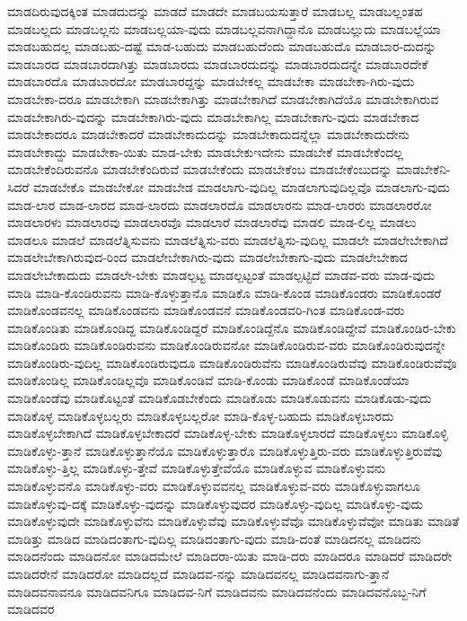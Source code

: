 {ಮಾಡದಿರುವುದಕ್ಕಿಂತ
ಮಾಡದುದನ್ನು
ಮಾಡದೆ
ಮಾಡದೇ
ಮಾಡಬಯಸುತ್ತಾರೆ
ಮಾಡಬಲ್ಲ
ಮಾಡಬಲ್ಲಂತಹ
ಮಾಡಬಲ್ಲದು
ಮಾಡಬಲ್ಲನು
ಮಾಡಬಲ್ಲಯಾ-ವುದು
ಮಾಡಬಲ್ಲವನಾಗಿದ್ದಾನೊ
ಮಾಡಬಲ್ಲುದು
ಮಾಡಬಲ್ಲೆಯಾ
ಮಾಡಬಹುದಲ್ಲ
ಮಾಡಬಹು-ದಷ್ಟೆ
ಮಾಡ-ಬಹುದು
ಮಾಡಬಹುದೆಂದು
ಮಾಡಬಹುದೊ
ಮಾಡಬಾರ-ದುದನ್ನು
ಮಾಡಬಾರದ
ಮಾಡಬಾರದಾಗಿತ್ತು
ಮಾಡಬಾರದು
ಮಾಡಬಾರದುದನ್ನು
ಮಾಡಬಾರದುದನ್ನೇ
ಮಾಡಬಾರದೇಕೆ
ಮಾಡಬಾರದೊ
ಮಾಡಬಾರದೋ
ಮಾಡಬಾರದ್ದನ್ನು
ಮಾಡಬೇಕಲ್ಲ
ಮಾಡಬೇಕಾ
ಮಾಡಬೇಕಾ-ಗಿರು-ವುದು
ಮಾಡಬೇಕಾ-ದರೂ
ಮಾಡಬೇಕಾಗಿ
ಮಾಡಬೇಕಾಗಿತ್ತು
ಮಾಡಬೇಕಾಗಿದೆ
ಮಾಡಬೇಕಾಗಿದೆಯೊ
ಮಾಡಬೇಕಾಗಿರುವ
ಮಾಡಬೇಕಾಗಿರು-ವುದನ್ನು
ಮಾಡಬೇಕಾಗಿರು-ವುದು
ಮಾಡಬೇಕಾಗಿಲ್ಲ
ಮಾಡಬೇಕಾಗು-ವುದು
ಮಾಡಬೇಕಾದ
ಮಾಡಬೇಕಾದರೂ
ಮಾಡಬೇಕಾದರೆ
ಮಾಡಬೇಕಾದುದನ್ನು
ಮಾಡಬೇಕಾದುದನ್ನೆಲ್ಲಾ
ಮಾಡಬೇಕಾದುದೇನು
ಮಾಡಬೇಕಾದ್ದು
ಮಾಡಬೇಕಾ-ಯಿತು
ಮಾಡ-ಬೇಕು
ಮಾಡಬೇಕುಇದೇನು
ಮಾಡಬೇಕೆ
ಮಾಡಬೇಕೆಂದಲ್ಲ
ಮಾಡಬೇಕೆಂದಿರುವನೊ
ಮಾಡಬೇಕೆಂದಿರುವೆ
ಮಾಡಬೇಕೆಂದು
ಮಾಡಬೇಕೆಂಬ
ಮಾಡಬೇಕೆಂಬುದನ್ನು
ಮಾಡಬೇಕೆನಿ-ಸಿದರೆ
ಮಾಡಬೇಕೊ
ಮಾಡಬೇಕೋ
ಮಾಡಬೇಡ
ಮಾಡಲಾಗು-ವುದಿಲ್ಲ
ಮಾಡಲಾಗುವುದಿಲ್ಲವೊ
ಮಾಡಲಾಗು-ವುದು
ಮಾಡ-ಲಾರ
ಮಾಡ-ಲಾರದ
ಮಾಡ-ಲಾರದು
ಮಾಡಲಾರದೊ
ಮಾಡಲಾರನು
ಮಾಡ-ಲಾರರು
ಮಾಡಲಾರರೋ
ಮಾಡಲಾರಳು
ಮಾಡಲಾರವು
ಮಾಡಲಾರವೊ
ಮಾಡಲಾರೆ
ಮಾಡಲಾರೆವು
ಮಾಡಲಿ
ಮಾಡ-ಲಿಲ್ಲ
ಮಾಡಲು
ಮಾಡಲೂ
ಮಾಡಲೆ
ಮಾಡಲೆತ್ನಿಸುವನು
ಮಾಡಲೆತ್ನಿಸು-ವರು
ಮಾಡಲೆತ್ನಿಸು-ವುದಿಲ್ಲ
ಮಾಡಲೇ
ಮಾಡಲೇಬೇಕಾಗಿದೆ
ಮಾಡಲೇಬೇಕಾಗಿರುವುದ-ರಿಂದ
ಮಾಡಲೇಬೇಕಾಗಿರು-ವುದು
ಮಾಡಲೇಬೇಕಾಗು-ವುದು
ಮಾಡಲೇಬೇಕಾದ
ಮಾಡಲೇಬೇಕಾದುದು
ಮಾಡಲೇ-ಬೇಕು
ಮಾಡಲ್ಪಟ್ಟ
ಮಾಡಲ್ಪಟ್ಟಂತೆ
ಮಾಡಲ್ಪಟ್ಟಿದೆ
ಮಾಡವ-ವರು
ಮಾಡ-ವುದು
ಮಾಡಿ
ಮಾಡಿ-ಕೊಂಡಿರುವನು
ಮಾಡಿ-ಕೊಳ್ಳುತ್ತಾನೊ
ಮಾಡಿಕೊ
ಮಾಡಿ-ಕೊಂಡ
ಮಾಡಿಕೊಂಡರು
ಮಾಡಿಕೊಂಡರೆ
ಮಾಡಿಕೊಂಡವನಲ್ಲ
ಮಾಡಿಕೊಂಡವನು
ಮಾಡಿಕೊಂಡವನೆ
ಮಾಡಿಕೊಂಡವರಿ-ಗಿಂತ
ಮಾಡಿಕೊಂಡ-ವರು
ಮಾಡಿಕೊಂಡಿತು
ಮಾಡಿಕೊಂಡಿದ್ದ
ಮಾಡಿಕೊಂಡಿದ್ದರೆ
ಮಾಡಿಕೊಂಡಿದ್ದೆನೊ
ಮಾಡಿಕೊಂಡಿದ್ದೇವೆ
ಮಾಡಿಕೊಂಡಿರ-ಬೇಕು
ಮಾಡಿಕೊಂಡಿರು
ಮಾಡಿಕೊಂಡಿರುವನು
ಮಾಡಿಕೊಂಡಿರುವನೋ
ಮಾಡಿಕೊಂಡಿರುವ-ವರು
ಮಾಡಿಕೊಂಡಿರುವುದನ್ನೇ
ಮಾಡಿಕೊಂಡಿರು-ವುದಿಲ್ಲ
ಮಾಡಿಕೊಂಡಿರುವುದೂ
ಮಾಡಿಕೊಂಡಿರುವೆನು
ಮಾಡಿಕೊಂಡಿರುವೆವು
ಮಾಡಿಕೊಂಡಿರುವೆವೊ
ಮಾಡಿಕೊಂಡಿಲ್ಲ
ಮಾಡಿಕೊಂಡಿಲ್ಲವೊ
ಮಾಡಿಕೊಂಡಿವೆ
ಮಾಡಿ-ಕೊಂಡು
ಮಾಡಿಕೊಂಡೆ
ಮಾಡಿಕೊಂಡೆಯಾ
ಮಾಡಿಕೊಂಡೆವು
ಮಾಡಿಕೊಟ್ಟಂತೆ
ಮಾಡಿಕೊಡಬೇಕೆಂದು
ಮಾಡಿಕೊಡು
ಮಾಡಿಕೊಡುವನು
ಮಾಡಿಕೊಡು-ವುದು
ಮಾಡಿಕೊಳ್ಳ
ಮಾಡಿಕೊಳ್ಳಬಲ್ಲರು
ಮಾಡಿಕೊಳ್ಳಬಲ್ಲರೋ
ಮಾಡಿ-ಕೊಳ್ಳ-ಬಹುದು
ಮಾಡಿಕೊಳ್ಳಬಾರದು
ಮಾಡಿಕೊಳ್ಳಬೇಕಾಗಿದೆ
ಮಾಡಿಕೊಳ್ಳಬೇಕಾದರೆ
ಮಾಡಿಕೊಳ್ಳ-ಬೇಕು
ಮಾಡಿಕೊಳ್ಳಲಾರದೆ
ಮಾಡಿಕೊಳ್ಳಲು
ಮಾಡಿಕೊಳ್ಳಿ
ಮಾಡಿಕೊಳ್ಳು-ತ್ತಾನೆ
ಮಾಡಿಕೊಳ್ಳುತ್ತಾನೆಯೊ
ಮಾಡಿಕೊಳ್ಳುತ್ತಾರೊ
ಮಾಡಿಕೊಳ್ಳುತ್ತಿರು-ವರು
ಮಾಡಿಕೊಳ್ಳುತ್ತಿರುವೆವು
ಮಾಡಿಕೊಳ್ಳು-ತ್ತಿಲ್ಲ
ಮಾಡಿಕೊಳ್ಳು-ತ್ತೇವೆ
ಮಾಡಿಕೊಳ್ಳುತ್ತೇವೆಯೊ
ಮಾಡಿಕೊಳ್ಳುವ
ಮಾಡಿಕೊಳ್ಳುವನು
ಮಾಡಿಕೊಳ್ಳುವನೊ
ಮಾಡಿಕೊಳ್ಳು-ವರು
ಮಾಡಿಕೊಳ್ಳುವವನಲ್ಲ
ಮಾಡಿಕೊಳ್ಳುವ-ವರು
ಮಾಡಿಕೊಳ್ಳುವಾಗಲೂ
ಮಾಡಿಕೊಳ್ಳುವು-ದಕ್ಕೆ
ಮಾಡಿಕೊಳ್ಳು-ವುದನ್ನು
ಮಾಡಿಕೊಳ್ಳುವುದರ
ಮಾಡಿಕೊಳ್ಳು-ವುದಿಲ್ಲ
ಮಾಡಿಕೊಳ್ಳು-ವುದು
ಮಾಡಿಕೊಳ್ಳುವುದೇ
ಮಾಡಿಕೊಳ್ಳುವೆನು
ಮಾಡಿಕೊಳ್ಳುವೆವು
ಮಾಡಿಕೊಳ್ಳುವೆವೊ
ಮಾಡಿಕೊಳ್ಳುವೆವೋ
ಮಾಡಿತು
ಮಾಡಿತೆ
ಮಾಡಿತ್ತು
ಮಾಡಿದ
ಮಾಡಿದಂತಾಗು-ವುದಿಲ್ಲ
ಮಾಡಿದಂತಾಗು-ವುದು
ಮಾಡಿ-ದಂತೆ
ಮಾಡಿದನಲ್ಲ
ಮಾಡಿದನು
ಮಾಡಿದನೆಂದು
ಮಾಡಿದನೋ
ಮಾಡಿದಮೇಲೆ
ಮಾಡಿದರಾ-ಯಿತು
ಮಾಡಿ-ದರು
ಮಾಡಿದರೂ
ಮಾಡಿದರೆ
ಮಾಡಿದರೇ
ಮಾಡಿದರೇನೆ
ಮಾಡಿದರೋ
ಮಾಡಿದಲ್ಲದೆ
ಮಾಡಿದವ-ನನ್ನು
ಮಾಡಿದವನಲ್ಲ
ಮಾಡಿದವನಾಗು-ತ್ತಾನೆ
ಮಾಡಿದವನಾವನೂ
ಮಾಡಿದವನಿಗೂ
ಮಾಡಿದವ-ನಿಗೆ
ಮಾಡಿದವನು
ಮಾಡಿದವನೆಂದು
ಮಾಡಿದವನೊಬ್ಬ-ನಿಗೆ
ಮಾಡಿದವರ
}
